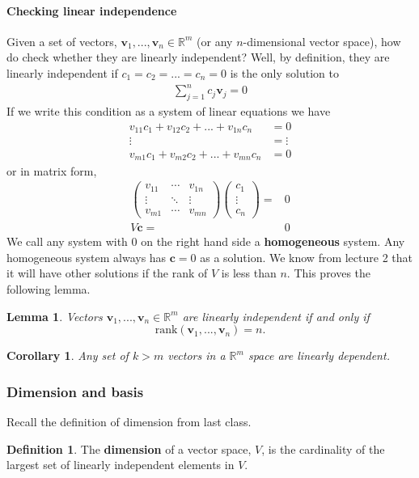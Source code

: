 \documentclass[12pt,reqno]{amsart}
\def\R{\mathbb{R}}
\newcommand{\gmatrix}[1]{\begin{pmatrix} {#1}_{11} & \cdots &
    {#1}_{1n} \\ \vdots & \ddots & \vdots \\ {#1}_{m1} & \cdots &
    {#1}_{mn} \end{pmatrix}}
\newcommand{\rank}{\mathrm{rank}}
\newtheorem{corollary}{Corollary}[section]
\newtheorem{lemma}{Lemma}[section]
\theoremstyle{definition}
\newtheorem{definition}{Definition}[section]
\begin{document}
\paragraph{Checking linear independence}
Given a set of vectors, $\mathbf{v}_1, ..., \mathbf{v}_n \in \R^m$ (or
any $n$-dimensional vector space), how do check whether they are
linearly independent? Well, by definition, they are linearly
independent if $c_1 = c_2 = ... = c_n = 0$ is the only solution to
\begin{align*}
  \sum_{j=1}^n c_j \mathbf{v}_j = 0 
\end{align*}
If we write this condition as a system of linear equations we have
\begin{align*}
  v_{11} c_1 + v_{12} c_2 + ... + v_{1n} c_n & = 0 \\
  \vdots & = \vdots \\
  v_{m1} c_1 + v_{m2} c_2 + ... + v_{mn} c_n & = 0 
\end{align*}
or in matrix form,
\begin{align*}
  \gmatrix{v} \begin{pmatrix} c_1 \\ \vdots \\ c_n \end{pmatrix} = &
  0 \\
  V \mathbf{c} = & 0 
\end{align*}
We call any system with $0$ on the right hand side a
\textbf{homogeneous} system. Any homogeneous system always has
$\mathbf{c}=0$ as a solution. We know from lecture 2 that it will have
other solutions if the rank of $V$ is less than $n$. This proves the
following lemma.
\begin{lemma}\label{lem:rankli}
  Vectors $\mathbf{v}_1, ..., \mathbf{v}_n \in \R^m$ are linearly
  independent if and only if
  \[ \rank(\mathbf{v}_1, ..., \mathbf{v}_n) = n. \]
\end{lemma}
\begin{corollary}\label{cor:kmli}
  Any set of $k>m$ vectors in a $\R^m$ space are linearly dependent.
\end{corollary}

\subsubsection{Dimension and basis}
Recall the definition of dimension from last class. 
\begin{definition}
  The \textbf{dimension} of a vector space, $V$, is the cardinality of
  the largest set of linearly independent elements in $V$.
\end{definition} 
\end{document}
